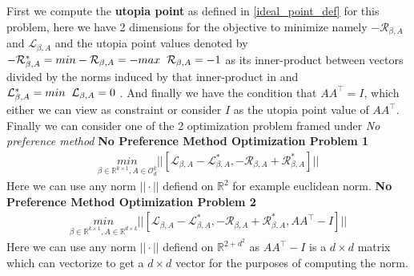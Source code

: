 \newpage
{}
First we compute the \textbf{utopia point} as defined in \ref{ideal_point_def} for this problem, here we have 2 dimensions for the objective to minimize namely $-\mathcal{R}_{\beta, A}$ and $\mathcal{L}_{\beta, A}$ and the utopia point values denoted by $-\mathcal{R}_{\beta, A}^* = min -\mathcal{R}_{\beta, A}  = - max\hspace{2mm} \mathcal{R}_{\beta, A} =  - 1 $ as its inner-product between vectors divided by the norms induced by that inner-product in and $\mathcal{L}_{\beta, A}^* =min \hspace{2mm} \mathcal{L}_{\beta, A} = 0$ . And finally we have the condition that $AA^\top = I$, which either we can view as constraint or consider $I$ as the utopia point value of $AA^\top$. Finally we can consider one of the 2 optimization problem framed under \textit{No preference method}
\newline \textbf{No Preference Method Optimization Problem 1}
\begin{equation} \label{NPMOP_1:objective}
\begin{aligned}
    \underset{\beta\in \mathbb{R}^{k\times 1},A\in \mathcal{O}^{k}_{d}}{min} || [\mathcal{L}_{\beta, A}-\mathcal{L}_{\beta, A}^*,-\mathcal{R}_{\beta, A}+\mathcal{R}_{\beta, A}^*]||
\end{aligned}
\end{equation}
Here we can use any norm $||\cdot ||$ defiend on $\mathbb{R}^2$ for example euclidean norm.
\hspace{2mm}
\newline \textbf{No Preference Method Optimization Problem 2}
\begin{equation} \label{NPMOP_2:objective}
\begin{aligned}
    \underset{\beta\in \mathbb{R}^{k\times 1},A\in \mathbb{R}^{d\times k}}{min} || [\mathcal{L}_{\beta, A}-\mathcal{L}_{\beta, A}^*,-\mathcal{R}_{\beta, A}+\mathcal{R}_{\beta, A}^*, AA^\top - I]||
\end{aligned}
\end{equation}
Here we can use any norm $||\cdot ||$ defiend on $\mathbb{R}^{2+d^2}$ as $AA^\top -I$ is a $d\times d$ matrix which can vectorize to get a $d\times d$ vector for the purposes of computing the norm.

